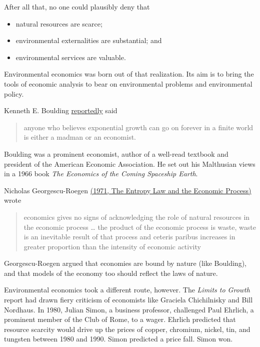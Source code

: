 After all that, no one could plausibly deny that
\begin{itemize}
    \item natural resources are scarce;
    \item environmental externalities are substantial; and
    \item environmental services are valuable.
\end{itemize}
Environmental economics was born out of that realization. Its aim is to bring the tools of economic analysis to bear on environmental problems and environmental policy.

Kenneth E. Boulding \href{https://www.jstor.org/stable/20024163?seq=1#metadata_info_tab_contents}{reportedly} said
\begin{quote}
    anyone who believes exponential growth can go on forever in a finite world is either a madman or an economist.
\end{quote}
Boulding was a prominent economist, author of a well-read textbook and president of the American Economic Association. He set out his Malthusian views in a 1966 book \emph{The Economics of the Coming Spaceship Earth}.

Nicholas Georgescu-Roegen \href{https://books.google.co.uk/books?hl=en&lr=&id=h1JUarFE1bYC&oi=fnd&pg=PA75&dq=Nicholas+Georgescu-Roegen,+The+Entropy+Law+and+the+Economic+Process&ots=81YMWmd5UJ&sig=WGLF6C6wj1NGn5Uu0r8nqiHjIzc#v=onepage&q=Nicholas\%20Georgescu-Roegen\%2C\%20The\%20Entropy\%20Law\%20and\%20the\%20Economic\%20Process&f=false}{(1971, The Entropy Law and the Economic Process)} wrote
\begin{quote}
    economics gives no signs of acknowledging the role of natural resources in the economic process … the product of the economic process is waste, waste is an inevitable result of that process and ceteris paribus increases in greater proportion than the intensity of economic activity
\end{quote}
Georgescu-Roegen argued that economies are bound by nature (like Boulding), and that models of the economy too should reflect the laws of nature.

Environmental economics took a different route, however. The \emph{Limits to Growth} report had drawn fiery criticism of economists like Graciela Chichilnisky and Bill Nordhaus. In 1980, Julian Simon, a business professor, challenged Paul Ehrlich, a prominent member of the Club of Rome, to a wager. Ehrlich predicted that resource scarcity would drive up the prices of copper, chromium, nickel, tin, and tungsten between 1980 and 1990. Simon predicted a price fall. Simon won.

